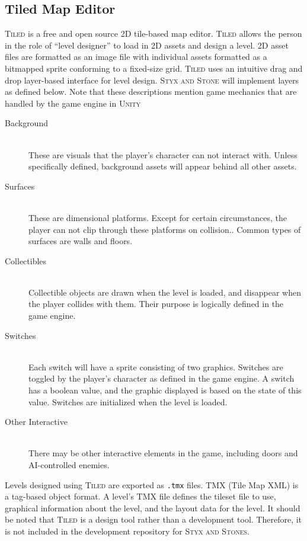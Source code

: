 \documentclass{article}
\begin{document}
\subsection{Tiled Map Editor}
\textsc{Tiled} is a free and open source 2D tile-based map editor. \textsc{Tiled} allows the person in the role of
``level designer'' to load in 2D assets and design a level. 2D asset files are formatted as an image file with
individual assets formatted as a bitmapped sprite conforming to a fixed-size grid. \textsc{Tiled} uses an intuitive
drag and drop layer-based interface for level design. \textsc{Styx and Stone} will implement layers as defined below.
Note that these descriptions mention game mechanics that are handled by the game engine in \textsc{Unity}
\begin{description}
    \item[Background] \hfill \\
        These are visuals that the player's character can not interact with. Unless specifically defined, background
        assets will appear behind all other assets.
    \item[Surfaces] \hfill \\
        These are dimensional platforms. Except for certain circumstances, the player can not clip through these
        platforms on collision.. Common types of surfaces are walls and floors.
    \item[Collectibles] \hfill \\
        Collectible objects are drawn when the level is loaded, and disappear when the player collides with them.
        Their purpose is logically defined in the game engine.
    \item[Switches] \hfill \\
        Each switch will have a sprite consisting of two graphics. Switches are toggled by the player's character as
        defined in the game engine. A switch has a boolean value, and the graphic displayed is based on the state of
        this value. Switches are initialized when the level is loaded.
    \item[Other Interactive] \hfill \\
        There may be other interactive elements in the game, including doors and AI-controlled enemies.
\end{description}

Levels designed using \textsc{Tiled} are exported as \texttt{.tmx} files. TMX (Tile Map XML) is a tag-based object
format. A level's TMX file defines the tileset file to use, graphical information about the level, and the layout data
for the level. It should be noted that \textsc{Tiled} is a design tool rather than a development tool. Therefore, it
is not included in the development repository for \textsc{Styx and Stones}.
\end{document}
